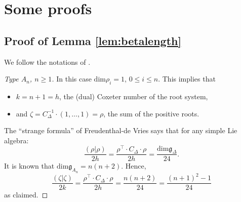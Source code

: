 \documentclass[11pt,a4paper]{amsart}
\theoremstyle{definition}
\begin{document}
\appendix
\section{Some proofs}
\subsection{Proof of Lemma \ref{lem:betalength}}
\label{sec:app1}
We follow the notations of \cite{bourbaki2002lie}. %
\begin{proof}[Type $A_n$, $n \geq 1$]
\label{sec:app11}
In this case $\mathrm{dim} \rho_i = 1$, $0 \leq i \leq n$. This implies that 
\begin{itemize}
 \item $k=n+1=h$, the (dual) Coxeter number of the root system,
 \item and $\zeta = C_{\Delta}^{-1} \cdot (1,\dots,1)= \rho$, the sum of the positive roots.
\end{itemize}
The ``strange formula'' of Freudenthal-de Vries \cite{freudenthal1969linear} says that for any simple Lie algebra:
\[ \frac{(\rho|\rho)}{2h}=\frac{\rho^\top \cdot C_\Delta \cdot \rho}{2h}=\frac{\mathrm{dim} \mathfrak{g}_{\Delta}}{24}. \]
It is known that $\mathrm{dim} \mathfrak{g}_{A_n}= n(n+2)$. Hence,
\[ \frac{(\zeta|\zeta)}{2k}=\frac{\rho^\top \cdot C_\Delta \cdot \rho}{2h}=\frac{n(n+2)}{24}=\frac{(n+1)^2-1}{24} \]
as claimed.
\end{proof}
\end{document}
